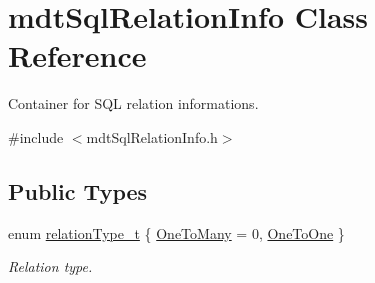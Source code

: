\hypertarget{classmdt_sql_relation_info}{\section{mdt\-Sql\-Relation\-Info Class Reference}
\label{classmdt_sql_relation_info}
}


Container for S\-Q\-L relation informations.  




{\ttfamily \#include $<$mdt\-Sql\-Relation\-Info.\-h$>$}

\subsection*{Public Types}
\begin{DoxyCompactItemize}
\item 
enum \hyperlink{classmdt_sql_relation_info_af36930de03b1cb16976f35987df2029e}{relation\-Type\-\_\-t} \{ \hyperlink{classmdt_sql_relation_info_af36930de03b1cb16976f35987df2029ea11ea783d6fb887a0b9790699d5cca6d0}{One\-To\-Many} = 0, 
\hyperlink{classmdt_sql_relation_info_af36930de03b1cb16976f35987df2029ea4850546d8fda8a60f9f1f673fa02eb5d}{One\-To\-One}
 \}
\begin{DoxyCompactList}\small\item\em Relation type. \end{DoxyCompactList}\end{DoxyCompactItemize}
